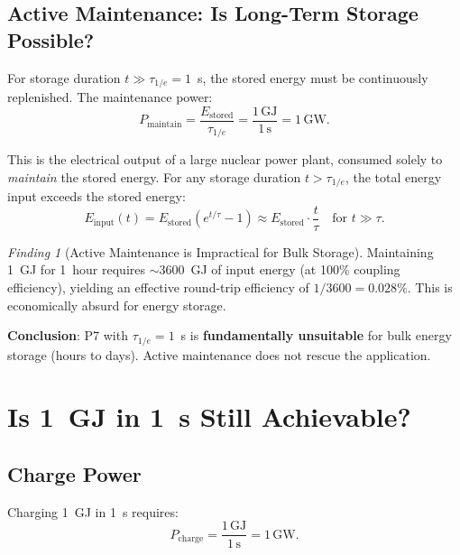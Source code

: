 \documentclass[11pt]{article}
\theoremstyle{definition}
\theoremstyle{remark}
\newtheorem{finding}[theorem]{Finding}
\begin{document}
\subsection{Active Maintenance: Is Long-Term Storage Possible?}

For storage duration $t \gg \tau_{1/e} = 1$~s, the stored energy must
be continuously replenished. The maintenance power:
\begin{equation}
P_{\mathrm{maintain}} = \frac{E_{\mathrm{stored}}}{\tau_{1/e}}
= \frac{1\,\mathrm{GJ}}{1\,\mathrm{s}} = 1\,\mathrm{GW}.
\label{eq:P-maintain}
\end{equation}

This is the electrical output of a large nuclear power plant, consumed
solely to \emph{maintain} the stored energy. For any storage duration
$t > \tau_{1/e}$, the total energy input exceeds the stored energy:
\begin{equation}
E_{\mathrm{input}}(t) = E_{\mathrm{stored}}\left(e^{t/\tau} - 1\right)
\approx E_{\mathrm{stored}} \cdot \frac{t}{\tau}
\quad\text{for $t \gg \tau$}.
\end{equation}

\begin{finding}[Active Maintenance is Impractical for Bulk Storage]
\label{finding:P7-maintenance}
Maintaining 1~GJ for 1~hour requires $\sim 3600$~GJ of input energy
(at 100\% coupling efficiency), yielding an effective round-trip
efficiency of $1/3600 = 0.028\%$. This is economically absurd for
energy storage.

\textbf{Conclusion}: P7 with $\tau_{1/e} = 1$~s is
\textbf{fundamentally unsuitable} for bulk energy storage (hours to
days). Active maintenance does not rescue the application.
\end{finding}

\section{Is 1~GJ in 1~s Still Achievable?}
\label{sec:P7-1GJ-1s}

\subsection{Charge Power}

Charging 1~GJ in 1~s requires:
\begin{equation}
P_{\mathrm{charge}} = \frac{1\,\mathrm{GJ}}{1\,\mathrm{s}} = 1\,\mathrm{GW}.
\end{equation}
\end{document}
